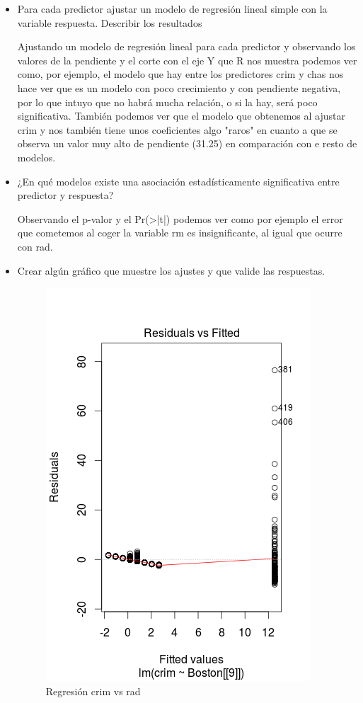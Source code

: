 \begin{itemize}

\item Para cada predictor ajustar un modelo de regresión lineal simple con la variable respuesta. Describir los resultados

Ajustando un modelo de regresión lineal para cada predictor y observando los valores de la pendiente y el corte con el eje Y que R nos muestra podemos ver como, por ejemplo, el modelo que hay entre los predictores crim y chas nos hace ver que es un modelo con poco crecimiento y con pendiente negativa, por lo que intuyo que no habrá mucha relación, o si la hay, será poco significativa. También podemos ver que el modelo que obtenemos al ajustar crim y nos también tiene unos coeficientes algo "raros" en cuanto a que se observa un valor muy alto de pendiente (31.25) en comparación con e resto de modelos. 

\item ¿En qué modelos existe una asociación estadísticamente significativa entre predictor y respuesta?

Observando el p-valor y el Pr(>|t|) podemos ver como por ejemplo el error que cometemos al coger la variable rm es insignificante, al igual que ocurre con rad.

\item Crear algún gráfico que muestre los ajustes y que valide las respuestas.

\begin{figure}[H]
\centering
\includegraphics[scale=.60]{regcrimrad.png}
\caption{Regresión crim vs rad}
\label{}
\end{figure}


\end{itemize}
